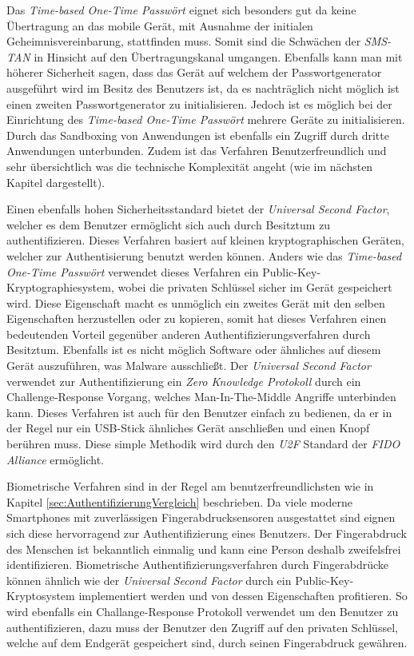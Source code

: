 \documentclass[11pt,a4paper,ngerman]{scrreprt}
\begin{document}
Das \textit{Time-based One-Time Passwört} eignet sich besonders gut da keine Übertragung an das mobile Gerät, mit Ausnahme der initialen Geheimnisvereinbarung, stattfinden muss. Somit sind die Schwächen der \textit{SMS-TAN} in Hinsicht auf den Übertragungskanal umgangen. Ebenfalls kann man mit höherer Sicherheit sagen, dass das Gerät auf welchem der Passwortgenerator ausgeführt wird im Besitz des Benutzers ist, da es nachträglich nicht möglich ist einen zweiten Passwortgenerator zu initialisieren. Jedoch ist es möglich bei der Einrichtung des \textit{Time-based One-Time Passwört} mehrere Geräte zu initialisieren. Durch das Sandboxing von Anwendungen ist ebenfalls ein Zugriff durch dritte Anwendungen unterbunden. Zudem ist das Verfahren Benutzerfreundlich und sehr übersichtlich was die technische Komplexität angeht (wie im nächsten Kapitel dargestellt).

Einen ebenfalls hohen Sicherheitsstandard bietet der \textit{Universal Second Factor}, welcher es dem Benutzer ermöglicht sich auch durch Besitztum zu authentifizieren. Dieses Verfahren basiert auf kleinen kryptographischen Geräten, welcher zur Authentisierung benutzt werden können. Anders wie das \textit{Time-based One-Time Passwört} verwendet dieses Verfahren ein Public-Key-Kryptographiesystem, wobei die privaten Schlüssel sicher im Gerät gespeichert wird. Diese Eigenschaft macht es unmöglich ein zweites Gerät mit den selben Eigenschaften herzustellen oder zu kopieren, somit hat dieses Verfahren einen bedeutenden Vorteil gegenüber anderen Authentifizierungsverfahren durch Besitztum. Ebenfalls ist es nicht möglich Software oder ähnliches auf diesem Gerät auszuführen, was Malware ausschließt. Der \textit{Universal Second Factor} verwendet zur Authentifizierung ein \textit{Zero Knowledge Protokoll} durch ein Challenge-Response Vorgang, welches Man-In-The-Middle Angriffe unterbinden kann. Dieses Verfahren ist auch für den Benutzer einfach zu bedienen, da er in der Regel nur ein USB-Stick ähnliches Gerät anschließen und einen Knopf berühren muss. Diese simple Methodik wird durch den \textit{U2F} Standard der \textit{FIDO Alliance} ermöglicht.

Biometrische Verfahren sind in der Regel am benutzerfreundlichsten wie in Kapitel \ref{sec:AuthentifizierungVergleich} beschrieben. Da viele moderne Smartphones mit zuverlässigen Fingerabdrucksensoren ausgestattet sind eignen sich diese hervorragend zur Authentifizierung eines Benutzers. Der Fingerabdruck des Menschen ist bekanntlich einmalig und kann eine Person deshalb zweifelsfrei identifizieren. Biometrische Authentifizierungsverfahren durch Fingerabdrücke können ähnlich wie der \textit{Universal Second Factor} durch ein Public-Key-Kryptosystem implementiert werden und von dessen Eigenschaften profitieren. So wird ebenfalls ein Challange-Response Protokoll verwendet um den Benutzer zu authentifizieren, dazu muss der Benutzer den Zugriff auf den privaten Schlüssel, welche auf dem Endgerät gespeichert sind, durch seinen Fingerabdruck gewähren.
\end{document}
